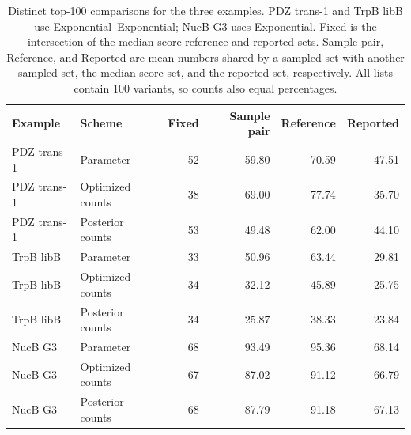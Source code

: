 \begingroup
\small
\setlength{\tabcolsep}{3pt}
\begin{table}[t]
\centering
\caption{Distinct top-100 comparisons for the three examples. PDZ trans-1 and TrpB libB use Exponential--Exponential; NucB G3 uses Exponential. Fixed is the intersection of the median-score reference and reported sets. Sample pair, Reference, and Reported are mean numbers shared by a sampled set with another sampled set, the median-score set, and the reported set, respectively. All lists contain 100 variants, so counts also equal percentages.}
\label{tab:reference-comparisons}
\begin{tabular}{llrrrr}
\toprule
Example & Scheme & Fixed & Sample pair & Reference & Reported \\
\midrule
PDZ trans-1 & Parameter & 52 & 59.80 & 70.59 & 47.51 \\
PDZ trans-1 & Optimized counts & 38 & 69.00 & 77.74 & 35.70 \\
PDZ trans-1 & Posterior counts & 53 & 49.48 & 62.00 & 44.10 \\
TrpB libB & Parameter & 33 & 50.96 & 63.44 & 29.81 \\
TrpB libB & Optimized counts & 34 & 32.12 & 45.89 & 25.75 \\
TrpB libB & Posterior counts & 34 & 25.87 & 38.33 & 23.84 \\
NucB G3 & Parameter & 68 & 93.49 & 95.36 & 68.14 \\
NucB G3 & Optimized counts & 67 & 87.02 & 91.12 & 66.79 \\
NucB G3 & Posterior counts & 68 & 87.79 & 91.18 & 67.13 \\
\bottomrule
\end{tabular}
\end{table}
\endgroup
